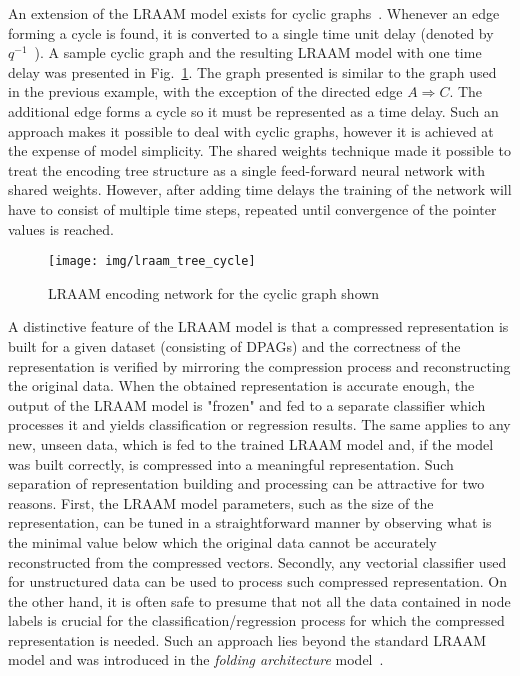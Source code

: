An extension of the LRAAM model exists for cyclic graphs~\cite{goulon2005hopfield}. Whenever an edge forming a cycle is found, it is converted to a single time unit delay (denoted by $q^{-1}$~\cite{frasconi1998general}). A sample cyclic graph and the resulting LRAAM model with one time delay was presented in Fig.~\ref{fig:lraam_tree_cycle}. The graph presented is similar to the graph used in the previous example, with the exception of the directed edge $A \Rightarrow C$. The additional edge forms a cycle so it must be represented as a time delay. Such an approach makes it possible to deal with cyclic graphs, however it is achieved at the expense of model simplicity. The shared weights technique made it possible to treat the encoding tree structure as a single feed-forward neural network with shared weights. However, after adding time delays the training of the network will have to consist of multiple time steps, repeated until convergence of the pointer values is reached.

\begin{figure}
\begin{center}
	\texttt{[image: img/lraam\_tree\_cycle]}
	\caption{LRAAM encoding network for the cyclic graph shown}
	\label{fig:lraam_tree_cycle}
\end{center}
\end{figure}

A distinctive feature of the LRAAM model is that a compressed representation is built for a given dataset (consisting of DPAGs) and the correctness of the representation is verified by mirroring the compression process and reconstructing the original data. When the obtained representation is accurate enough, the output of the LRAAM model is "frozen" and fed to a separate classifier which processes it and yields classification or regression results. The same applies to any new, unseen data, which is fed to the trained LRAAM model and, if the model was built correctly, is compressed into a meaningful representation. Such separation of representation building and processing can be attractive for two reasons. First, the LRAAM model parameters, such as the size of the representation, can be tuned in a straightforward manner by observing what is the minimal value below which the original data cannot be accurately reconstructed from the compressed vectors. Secondly, any vectorial classifier used for unstructured data can be used to process such compressed representation. On the other hand, it is often safe to presume that not all the data contained in node labels is crucial for the classification/regression process for which the compressed representation is needed. Such an approach lies beyond the standard LRAAM model and was introduced in the \emph{folding architecture} model~\cite{kuchler1996inductive}.

